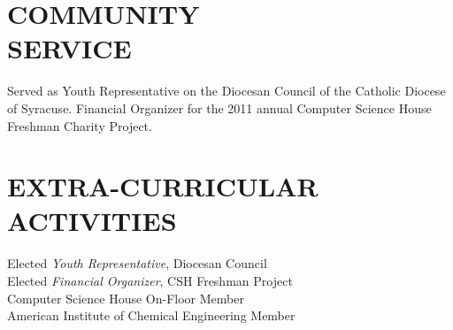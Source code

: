 \documentclass[line,margin]{res}
\begin{document}
\begin{resume}
\section{COMMUNITY \\ SERVICE}  Served as Youth Representative on the 
                Diocesan Council of the Catholic Diocese of Syracuse. \newline 
                Financial Organizer for the 2011 annual Computer Science House
                Freshman Charity Project. 

\section{EXTRA-CURRICULAR \\ ACTIVITIES}             
            Elected {\it Youth Representative}, Diocesan Council \\
            Elected {\it Financial Organizer}, CSH Freshman Project \\
            	Computer Science House On-Floor Member \\
                American Institute of Chemical Engineering Member \\
\end{resume}
\end{document}
